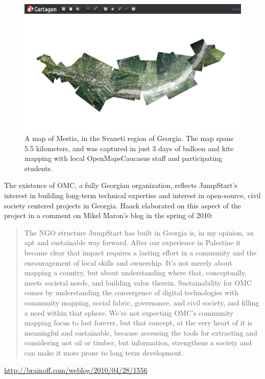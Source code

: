 \documentclass[11pt,oneside,notitlepage]{report}
\begin{document}
\begin{figure}[h]
  \begin{center}
	\includegraphics[width=1\textwidth]{images/mestia-cartagen.png}
	\caption{A map of Mestia, in the Svaneti region of Georgia. The map spans 5.5 kilometers, and was captured in just 3 days of balloon and kite mapping with local OpenMapsCaucasus staff and participating students.}
  \end{center}
\end{figure}

The existence of \ac{OMC}, a fully Georgian organization, reflects JumpStart's interest in building long-term technical expertise and interest in open-source, civil society centered projects in Georgia. Haack elaborated on this aspect of the project in a comment on Mikel Maron's blog in the spring of 2010: 

\begin{quote}The NGO structure JumpStart has built in Georgia is, in my opinion, an apt and sustainable way forward. After our experience in Palestine it became clear that impact requires a lasting effort in a community and the encouragement of local skills and ownership. It’s not merely about mapping a country, but about understanding where that, conceptually, meets societal needs, and building value therein. Sustainability for \ac{OMC} comes by understanding the convergence of digital technologies with community mapping, social fabric, governance, and civil society, and filling a need within that sphere. We’re not expecting \ac{OMC}’s community mapping focus to last forever, but that concept, at the very heart of it is meaningful and sustainable, because accessing the tools for extracting and considering not oil or timber, but information, strengthens a society and can make it more prone to long term development.\end{quote} \url{http://brainoff.com/weblog/2010/04/28/1556}
\end{document}
